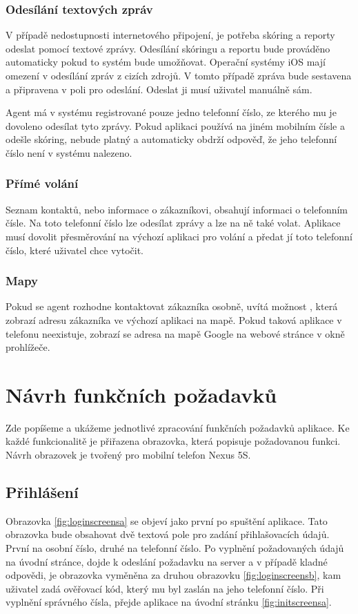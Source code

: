 \documentclass[11pt,twoside,a4paper]{book}
\begin{document}
\subsubsection{Odesílání textových zpráv}
V případě nedostupnosti internetového připojení, je potřeba skóring a reporty odeslat pomocí textové zprávy. Odesílání skóringu a reportu bude prováděno automaticky pokud to systém bude umožňovat. Operační systémy iOS mají omezení v odesílání zpráv z cizích zdrojů. V tomto případě zpráva bude sestavena a připravena v poli pro odeslání. Odeslat ji musí uživatel manuálně sám.

Agent má v systému registrované pouze jedno telefonní číslo, ze kterého mu je dovoleno odesílat tyto zprávy. Pokud aplikaci používá na jiném mobilním čísle a odešle skóring, nebude platný a automaticky obdrží odpověď, že jeho telefonní číslo není v systému nalezeno.

\subsubsection{Přímé volání}
Seznam kontaktů, nebo informace o zákazníkovi, obsahují informaci o telefonním čísle. Na toto telefonní číslo lze odesílat zprávy a lze na ně také volat. Aplikace musí dovolit přesměrování na výchozí aplikaci pro volání a předat jí toto telefonní číslo, které uživatel chce vytočit.

\subsubsection{Mapy}
Pokud se agent rozhodne kontaktovat zákazníka osobně, uvítá možnost , která zobrazí adresu zákazníka ve výchozí aplikaci na mapě. Pokud taková aplikace v telefonu neexistuje, zobrazí se adresa na mapě Google na webové stránce v okně prohlížeče.

\section{Návrh funkčních požadavků}
Zde popíšeme a ukážeme jednotlivé zpracování funkčních požadavků aplikace. Ke každé funkcionalitě je přiřazena obrazovka, která popisuje požadovanou funkci. Návrh obrazovek je tvořený pro mobilní telefon Nexus 5S.

\subsection{Přihlášení}
Obrazovka \ref{fig:loginscreensa} se objeví jako první po spuštění aplikace. Tato obrazovka bude obsahovat dvě textová pole pro zadání přihlašovacích údajů. První na osobní číslo, druhé na telefonní číslo. Po vyplnění požadovaných údajů na úvodní stránce, dojde k odeslání požadavku na server a v případě kladné odpovědi, je obrazovka vyměněna za druhou obrazovku \ref{fig:loginscreensb}, kam uživatel zadá ověřovací kód, který mu byl zaslán na jeho telefonní číslo. Při vyplnění správného čísla, přejde aplikace na úvodní stránku \ref{fig:initscreensa}.
\end{document}
